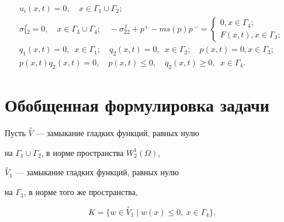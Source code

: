 \begin{gather}


u_{i}(x,t) = 0, \quad x \in \Gamma_{1} \cup \Gamma_{2};\label{eq5} \\


%


\sigma_{12}^{f} = 0, \quad x \in \Gamma_{3} \cup \Gamma_{4}; \quad


- \sigma_{22}^{f} + p^{+} - ms(p)p^{\,-} = \begin{cases}


0, x \in \Gamma_{4}; \\ F(x,t), x \in \Gamma_{3};\end{cases}\label{eq6} \\


%


q_{1}(x,t) = 0,\ \; x \in \Gamma_{1}; \quad q_{2}(x,t) = 0,\ \; x


\in \Gamma_{2}; \quad p(x,t) = 0, x \in \Gamma_{3};\label{eq7} \\


%


p(x,t)q_{2}(x,t) = 0, \quad p(x,t) \leq 0, \quad q_{2}(x,t) \geq 0,


\ \; x \in \Gamma_{4}.\label{eq8}


\end{gather}





\section{Обобщенная формулировка задачи}





Пусть $\overset{\circ}{V}$ --- замыкание гладких функций, равных нулю


на $\Gamma_{1} \cup \Gamma_{2}$, в норме пространства $W_{2}^{1}(\Omega)$,


$\overset{\circ}{V}_{1}$ --- замыкание гладких функций, равных нулю


на $ \Gamma_{3}$, в норме того же пространства,


$$


K =\{w \in \overset{\circ}{V}_{1} \mid w(x) \leq 0,\ x \in\Gamma_{4}\}.


$$





